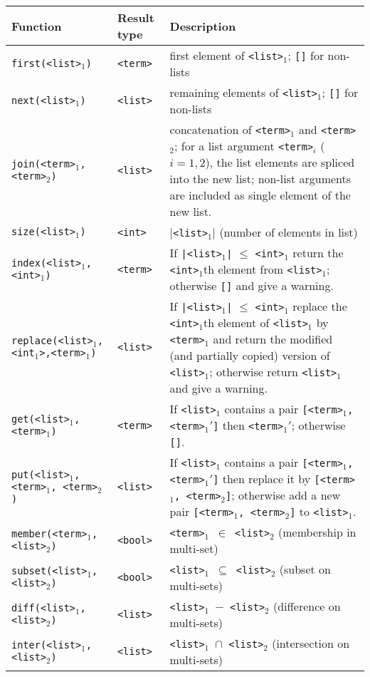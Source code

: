 \begin{tabular}{|l|l|p{8cm}|} \hline
 Function			& Result type 	& Description \\ \hline
 {\tt first(<list>$_1$)}		& {\tt  <term>}  & first element of {\tt <list>$_1$}; {\tt []} for non-lists\\
 {\tt next(<list>$_1$)}			& {\tt  <list>}  & remaining elements of {\tt <list>$_1$}; {\tt []} for non-lists \\
 {\tt join(<term>$_1$,<term>$_2$)}	& {\tt  <list>}  & concatenation of {\tt <term>$_1$} and {\tt <term>$_2$};
							   for a list argument {\tt <term>$_i$} ($i=1,2$),
							   the list elements are spliced into the new list;
							   non-list arguments are included as single element of the
							   new list. \\
 {\tt size(<list>$_1$)}			& {\tt  <int>} 	 & {\tt $|$<list>$_1|$} (number of elements in list)\\ \hline

 {\tt index(<list>$_1$,<int>$_1$)}	& {\tt <term>}	 & If {\tt |<list>$_1$|} $\leq$ {\tt <int>$_1$} return the
							   {\tt <int>$_1$}th element from {\tt <list>$_1$};
						           otherwise {\tt []} and give a warning.\\
 {\tt replace(<list>$_1$,<int$_1$>,<term>$_1$)} & {\tt <list>}	 &  If {\tt |<list>$_1$|} $\leq$ {\tt <int>$_1$} replace the
							   {\tt <int>$_1$}th element of {\tt <list>$_1$} by 
							   {\tt <term>$_1$} and return the modified (and partially
							   copied) version of {\tt <list>$_1$};
						           otherwise return {\tt <list>$_1$} and give a warning.\\  \hline

 {\tt get(<list>$_1$,<term>$_1$)}	& {\tt <term>}	 & If {\tt <list>$_1$} contains a pair
							   {\tt [<term>$_1$, <term>$_1'$]} then {\tt <term>$_1'$};
						           otherwise {\tt []}.\\
 {\tt put(<list>$_1$,<term>$_1$, <term>$_2$)}	& {\tt <list>}	 & If {\tt <list>$_1$} contains a pair
							   {\tt [<term>$_1$, <term>$_1'$]} then replace it by
							   {\tt [<term>$_1$, <term>$_2$]}; otherwise add a new pair	
							   {\tt [<term>$_1$, <term>$_2$]} to {\tt <list>$_1$}. \\ \hline


 {\tt member(<term>$_1$,<list>$_2$)}	& {\tt  <bool>}  & {\tt <term>$_1$ $\in$ <list>$_2$} (membership in multi-set)\\
 {\tt subset(<list>$_1$, <list>$_2$)}	& {\tt  <bool>}  & {\tt <list>$_1$ $\subseteq$ <list>$_2$} (subset on multi-sets)\\
 {\tt diff(<list>$_1$, <list>$_2$)}	& {\tt  <list>}  & {\tt <list>$_1$ $-$ <list>$_2$} (difference on multi-sets)\\
 {\tt inter(<list>$_1$, <list>$_2$)}	& {\tt  <list>}  & {\tt <list>$_1$ $\cap$ <list>$_2$} (intersection on multi-sets)\\ \hline
\end{tabular}

